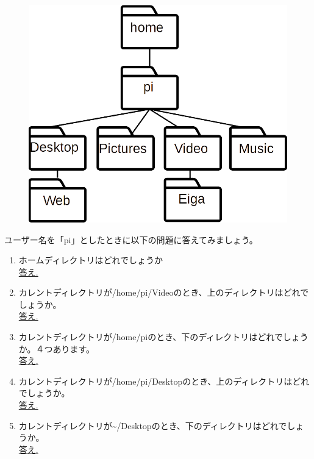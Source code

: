 \begin{tcolorbox}[title=\useOmetoi]
\begin{figure}[H]
 \centering
 \includegraphics[width=0.6\linewidth]{images/chap03/text03-img005.png}
\end{figure}
ユーザー名を「pi」としたときに以下の問題に答えてみましょう。
\begin{enumerate}
\item ホームディレクトリはどれでしょうか\\
\underline{答え.\hspace{0.8\linewidth}}
\item カレントディレクトリが/home/pi/Videoのとき、上のディレクトリはどれでしょうか。\\
\underline{答え.\hspace{0.8\linewidth}}
\item カレントディレクトリが/home/piのとき、下のディレクトリはどれでしょうか。４つあります。\\
\underline{答え.\hspace{0.8\linewidth}}
\item カレントディレクトリが/home/pi/Desktopのとき、上のディレクトリはどれでしょうか。\\
\underline{答え.\hspace{0.8\linewidth}}
\item カレントディレクトリが\textasciitilde /Desktopのとき、下のディレクトリはどれでしょうか。\\
\underline{答え.\hspace{0.8\linewidth}}
\end{enumerate}
\end{tcolorbox}
　